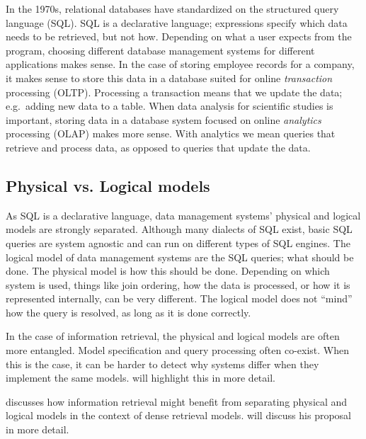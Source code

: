 In the 1970s, relational databases have standardized on the structured query language (SQL).  
SQL is a declarative language; expressions specify which data needs to be retrieved, but not how. Depending on what a user expects from the program, choosing different database management systems for different applications makes sense. In the case of storing employee records for a company, it makes sense to store this data in a database suited for online \emph{transaction} processing (OLTP). Processing a transaction means that we update the data; e.g.\ adding new data to a table. When data analysis for scientific studies is important, storing data in a database system focused on online \emph{analytics} processing (OLAP) makes more sense. With analytics we mean queries that retrieve and process data, as opposed to queries that update the data.  

\subsection{Physical vs. Logical models}
As SQL is a declarative language, data management systems' physical and logical models are strongly separated. Although many dialects of SQL exist, basic SQL queries are system agnostic and can run on different types of SQL engines. The logical model of data management systems are the SQL queries; what should be done. The physical model is how this should be done. Depending on which system is used, things like join ordering, how the data is processed, or how it is represented internally, can be very different. The logical model does not ``mind'' how the query is resolved, as long as it is done correctly. 

In the case of information retrieval, the physical and logical models are often more entangled. Model specification and query processing often co-exist. When this is the case, it can be harder to detect why systems differ when they implement the same models.  will highlight this in more detail. 

\citet{seperation-logical-physical} discusses how information retrieval might benefit from separating physical and logical models in the context of dense retrieval models.  will discuss his proposal in more detail.

